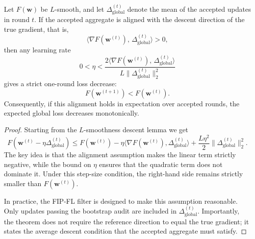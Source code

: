 \begin{theorem}
\label{thm:fip-convergence}
Let $F(\mathbf{w})$ be $L$-smooth, and let $\Delta_{\text{global}}^{(t)}$ denote the mean of the accepted updates in round $t$. If the accepted aggregate is aligned with the descent direction of the true gradient, that is,
\begin{equation}
    \langle \nabla F(\mathbf{w}^{(t)}),\, \Delta_{\text{global}}^{(t)} \rangle > 0,
\end{equation}
then any learning rate
\begin{equation}
    0 < \eta < \frac{2\langle \nabla F(\mathbf{w}^{(t)}),\, \Delta_{\text{global}}^{(t)} \rangle}{L\|\Delta_{\text{global}}^{(t)}\|_2^2}
\end{equation}
gives a strict one-round loss decrease:
\begin{equation}
    F(\mathbf{w}^{(t+1)}) < F(\mathbf{w}^{(t)}).
\end{equation}
Consequently, if this alignment holds in expectation over accepted rounds, the expected global loss decreases monotonically.
\end{theorem}

\begin{proof}
Starting from the $L$-smoothness descent lemma we get
\begin{equation}
    F(\mathbf{w}^{(t)}-\eta\Delta_{\text{global}}^{(t)})
    \le
    F(\mathbf{w}^{(t)})
    -\eta\langle\nabla F(\mathbf{w}^{(t)}),\Delta_{\text{global}}^{(t)}\rangle
    +\frac{L\eta^2}{2}\|\Delta_{\text{global}}^{(t)}\|_2^2 .
\end{equation}
The key idea is that the alignment assumption makes the linear term strictly negative, while the bound on $\eta$ ensures that the quadratic term does not dominate it. Under this step-size condition, the right-hand side remains strictly smaller than $F(\mathbf{w}^{(t)})$.

In practice, the FIP-FL filter is designed to make this assumption reasonable. Only updates passing the bootstrap audit are included in $\Delta_{\text{global}}^{(t)}$. Importantly, the theorem does not require the reference direction to equal the true gradient; it states the average descent condition that the accepted aggregate must satisfy.
\end{proof}

\flushbottom %
